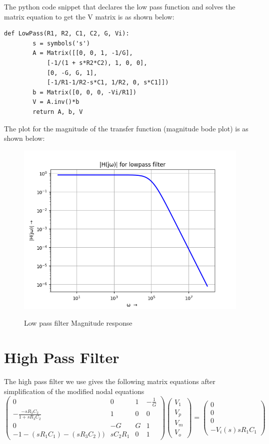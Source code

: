\documentclass[11pt, a4paper]{article}
\begin{document}
The python code snippet that declares the low pass function and solves the matrix equation to get the V matrix is as shown below:
\begin{verbatim}
def LowPass(R1, R2, C1, C2, G, Vi):
    	s = symbols('s')
    	A = Matrix([[0, 0, 1, -1/G],
    		[-1/(1 + s*R2*C2), 1, 0, 0],
    		[0, -G, G, 1],
    		[-1/R1-1/R2-s*C1, 1/R2, 0, s*C1]])
    	b = Matrix([0, 0, 0, -Vi/R1])
    	V = A.inv()*b
    	return A, b, V
\end{verbatim}
The plot for the magnitude of the transfer function (magnitude bode plot) is as shown below:
\begin{figure}[!tbh]
   	\centering
   	\includegraphics[width=1.0\textwidth]{Ass7_Figure_0.png}
   	\label{fig:32}
   	\caption{Low pass filter Magnitude response}
   \end{figure}

\section*{High Pass Filter}
The high pass filter we use gives the following matrix equations after simplification of the modified nodal equations
\[\begin{pmatrix} 0 & 0 & 1 & -\frac{1}{G} \\ -\frac{-sR_3C_2}{1+sR_3C_2} & 1 & 0 & 0 \\ 0 & -G & G & 1 \\ -1-(sR_1C_1)-(sR_3C_2)) & sC_2R_1 & 0 & 1 \end{pmatrix}\begin{pmatrix} V_1 \\ V_p \\ V_m \\ V_o \end{pmatrix} = \begin{pmatrix} 0 \\ 0 \\ 0 \\ -V_i(s)sR_1C_1 \end{pmatrix}\]
\end{document}
